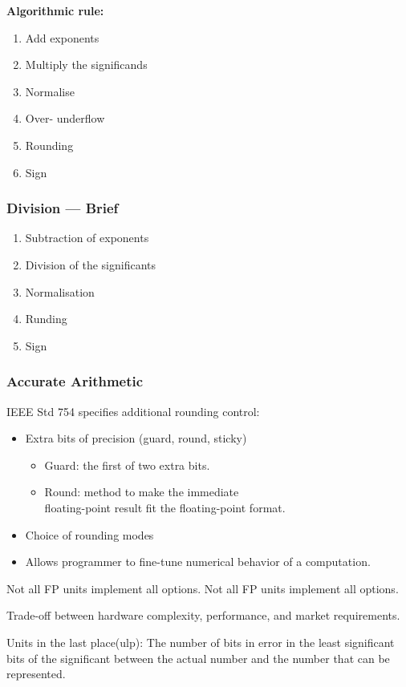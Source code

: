 \textbf{Algorithmic rule:}
\begin{enumerate}
    \item Add exponents
    \item Multiply the significands
    \item Normalise
    \item Over- underflow
    \item Rounding
    \item Sign
\end{enumerate}

\subsubsection{Division --- Brief}
\begin{enumerate}
    \item Subtraction of exponents
    \item Division of the significants
    \item Normalisation
    \item Runding
    \item Sign
\end{enumerate}

\subsubsection{Accurate Arithmetic}
IEEE Std 754 specifies additional rounding control: 
\begin{itemize}
    \item Extra bits of precision (guard, round, sticky)
    \begin{itemize}
        \item Guard: the first of two extra bits.
        \item Round: method to make the immediate\\ floating-point result fit the floating-point format.
    \end{itemize}
    \item Choice of rounding modes
    \item Allows programmer to fine-tune numerical behavior of a computation. 
\end{itemize}

Not all FP units implement all options. Not all FP units implement all options. 

Trade-off between hardware complexity, performance, and market requirements.

Units in the last place(ulp): The number of bits in error in the least significant bits of the significant between the actual number and the number that can be represented.